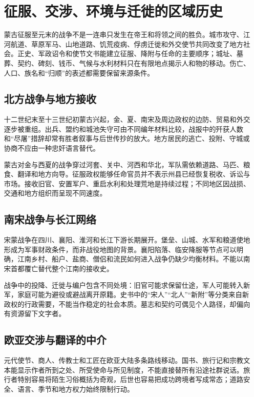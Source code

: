 \section{征服、交涉、环境与迁徙的区域历史}
\label{sec:yuan-conquest-diplomacy-environment-migration}

蒙古征服至元末的战争不是一连串只发生在帝王和将领之间的胜负。城市攻守、江河航道、草原军马、山地道路、饥荒疫病、俘虏迁徙和外交使节共同改变了地方社会。正史、军政诏令和使节文书能建立征服、降附与任命的主要顺序；城址、墓葬、契约、碑刻、钱币、气候与水利材料只在有限地点揭示人和物的移动。伤亡、人口、族名和“归顺”的表述都需要保留来源条件。

\subsection{北方战争与地方接收}

十二世纪末至十三世纪初蒙古兴起，金、夏、南宋及周边政权的边防、贸易和外交逐步被重组。出兵、盟约和城池失守可由不同编年材料比较，战报中的歼获人数和“尽屠”措辞却常有胜者叙事与后世传抄的放大。地方居民的逃亡、投附、守城或协商不应由一种忠奸语言替代。

蒙古对金与西夏的战争穿过河套、关中、河西和华北，军队需依赖道路、马匹、粮食、翻译和地方向导。征服政权能够任命官员并不表示州县已经恢复税收、诉讼与市场。接收旧官、安置军户、重启水利和处理荒地是持续过程；不同地区因战损、交通和地方组织而呈现不同速度。

\subsection{南宋战争与长江网络}

宋蒙战争在四川、襄阳、淮河和长江下游长期展开。堡垒、山城、水军和粮道使地形成为军事财政条件，而非战役地图的背景。襄阳陷落、临安降服等节点可以明确，江南乡村、船户、盐商、僧侣和流民如何进入战争仍缺少均衡材料。不能以南宋首都覆亡替代整个江南的接收史。

战争中的投降、迁徙与编户包含不同处境：旧官可能求保留仕途，军人可能转入新军，家庭可能为避役或避战离开原籍。史书中的“宋人”“北人”“新附”等分类来自新政权的行政需要，不能当作稳定的社会本质。墓志和契约可偶见个人路径，却偏向有资源留下文字者。

\subsection{欧亚交涉与翻译的中介}

元代使节、商人、传教士和工匠在欧亚大陆多条路线移动。国书、旅行记和宗教文本能显示作者所到之处、所受使命与所见制度，不能直接替所有沿途社群说话。旅行者特别容易将陌生习俗概括为奇观，后世也容易把成功跨境者写成常态；道路安全、语言、季节和地方权力始终限制行动。

